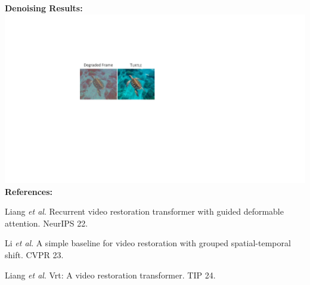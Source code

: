 \documentclass[landscape,paperwidth=48in,paperheight=36in,fontscale=0.3]{baposter}
\begin{document}
\begin{poster}
{\begin{minipage}[t]{.24\linewidth}
\small
\textbf{\color{blue}Denoising Results:}\\
\includegraphics[width=1.2\linewidth]{new_imgs/turtle_denoise.pdf}
\vspace{2em}
\textbf{\color{blue}References:}\\
\vspace{-2em}
\begin{enumerate}[label={[\arabic*]}]
    \item Liang \textit{et al}. Recurrent video restoration transformer with guided deformable attention. NeurIPS 22.
    \item Li \textit{et al}. A simple baseline for video restoration with grouped spatial-temporal shift. CVPR 23.
    \item Liang \textit{et al}. Vrt: A video restoration transformer. TIP 24.
\end{enumerate}
\end{minipage}
}


\end{poster}
\end{document}
